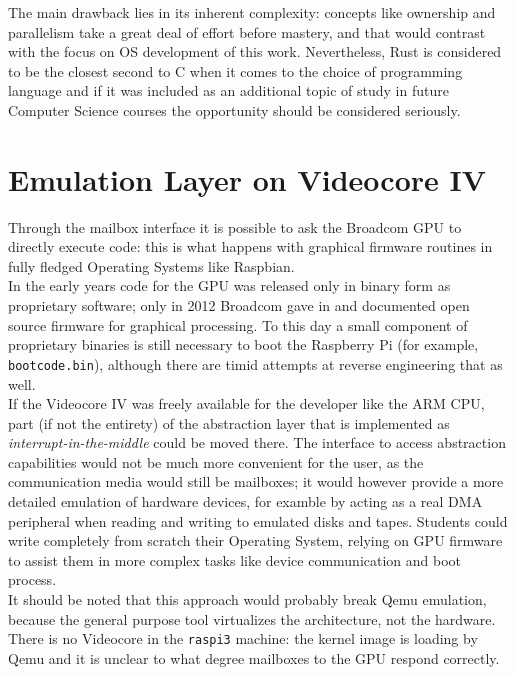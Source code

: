 \documentclass[12pt,a4paper,openright,twoside]{report}
\begin{document}
The main drawback lies in its inherent complexity: concepts like ownership and 
parallelism take a great deal of effort before mastery, and that would contrast
with the focus on OS development of this work. Nevertheless, Rust is considered
to be the closest second to C when it comes to the choice of programming language
and if it was included as an additional topic of study in future Computer Science
courses the opportunity should be considered seriously.

\section{Emulation Layer on Videocore IV}
Through the mailbox interface it is possible to ask the Broadcom GPU to directly
execute code: this is what happens with graphical firmware routines in fully
fledged Operating Systems like Raspbian.\\
In the early years code for the GPU was released only in binary form as proprietary 
software; only in 2012 Broadcom gave in and documented open source firmware for 
graphical processing. To this day a small component of proprietary binaries is 
still necessary to boot the Raspberry Pi (for example, {\tt bootcode.bin}), although
there are timid attempts at reverse engineering that as well.\\

If the Videocore IV was freely available for the developer like the ARM CPU, part
(if not the entirety) of the abstraction layer that is implemented as 
\textit{interrupt-in-the-middle} could be moved there. The interface to access
abstraction capabilities would not be much more convenient for the user, 
as the communication media would still be mailboxes; it would however provide
a more detailed emulation of hardware devices, for examble by acting as a real
DMA peripheral when reading and writing to emulated disks and tapes.
Students could write completely from scratch their Operating System, relying on 
GPU firmware to assist them in more complex tasks like device communication and
boot process.\\
It should be noted that this approach would probably break Qemu emulation, 
because the general purpose tool virtualizes the architecture, not the hardware.
There is no Videocore in the {\tt raspi3} machine: the kernel image is loading 
by Qemu and it is unclear to what degree mailboxes to the GPU respond correctly.
\end{document}
